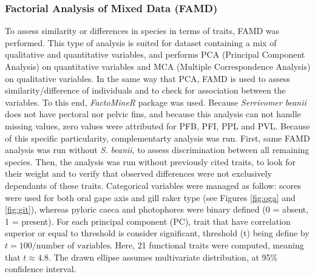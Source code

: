 \subsubsection{Factorial Analysis of Mixed Data (FAMD)}
To assess similarity or differences in species in terms of traits, FAMD was performed. This type of analysis is suited for dataset containing a mix of qualitative and quantitative variables, and performs PCA (Principal Component Analysis) on quantitative variables and MCA (Multiple Correspondence Analysis) on qualitative variables. In the same way that PCA, FAMD is used to assess similarity/difference of individuals and to check for association between the variables. To this end, \emph{FactoMineR} package was used. Because \textit{Serrivomer beanii} does not have pectoral nor pelvic fins, and because this analysis can not handle missing values, zero values were attributed for \textsc{PFB}, \textsc{PFI}, \textsc{PPL} and \textsc{PVL}. Because of this specific particularity, complementarty analysis was run. First, same FAMD analysis was run without \textit{S. beanii}, to assess discrimination between all remaining species. Then, the analysis was run without previously cited traits, to look for their weight and to verify that observed differences were not exclusively dependants of these traits. Categorical variables were managed as follow: scores were used for both oral gape axis and gill raker type (see Figures \ref{fig:oga} and \ref{fig:git}), whereas pyloric caeca and photophores were binary defined (0 = absent, 1 = present). For each principal component (PC), trait that have correlation superior or equal to threshold is consider significant, threshold (t) being define by $t = 100 / \text{number of variables}$. Here, 21 functional traits were computed, meaning that $t \approx 4.8$. The drawn ellipse assumes multivariate distribution, at 95\% confidence interval.

